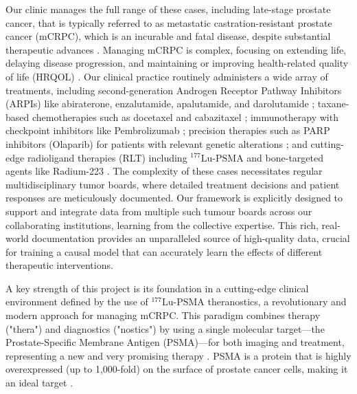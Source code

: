 \documentclass[11pt, a4paper]{article}
\begin{document}
Our clinic manages the full range of these cases, including late-stage prostate cancer, that is  typically referred to as metastatic castration-resistant prostate cancer (mCRPC), which is an incurable and fatal disease, despite substantial therapeutic advances \cite{FizaziHerrmann2023, HatanoNonomura2023}. Managing mCRPC is complex, focusing on extending life, delaying disease progression, and maintaining or improving health-related quality of life (HRQOL) \cite{FizaziHerrmann2023}. Our clinical practice routinely administers a wide array of treatments, including second-generation Androgen Receptor Pathway Inhibitors (ARPIs) like abiraterone, enzalutamide, apalutamide, and darolutamide \cite{FizaziHerrmann2023, HatanoNonomura2023, MaLi2022}; taxane-based chemotherapies such as docetaxel and cabazitaxel \cite{FizaziHerrmann2023, HatanoNonomura2023}; immunotherapy with checkpoint inhibitors like Pembrolizumab \cite{MaLi2022, RamnaraignSartor2023}; precision therapies such as PARP inhibitors (Olaparib) for patients with relevant genetic alterations \cite{HatanoNonomura2023, MaLi2022}; and cutting-edge radioligand therapies (RLT) including $^{\text{177}}\text{Lu-PSMA}$ and bone-targeted agents like Radium-223 \cite{FizaziHerrmann2023, ChandranFigg2022, Keam2022}. The complexity of these cases necessitates regular multidisciplinary tumor boards, where detailed treatment decisions and patient responses are meticulously documented. Our framework is explicitly designed to support and integrate data from multiple such tumour boards across our collaborating institutions, learning from the collective expertise. This rich, real-world documentation provides an unparalleled source of high-quality data, crucial for training a causal model that can accurately learn the effects of different therapeutic interventions.

A key strength of this project is its foundation in a cutting-edge clinical environment defined by the use of $^{\text{177}}\text{Lu-PSMA}$ theranostics, a revolutionary and modern approach for managing mCRPC. This paradigm combines therapy ("thera") and diagnostics ("nostics") by using a single molecular target—the Prostate-Specific Membrane Antigen (PSMA)—for both imaging and treatment, representing a new and very promising therapy \cite{HennrichEder2022}. PSMA is a protein that is highly overexpressed (up to 1,000-fold) on the surface of prostate cancer cells, making it an ideal target \cite{HennrichEder2022, LingBlois2022}.
\end{document}
